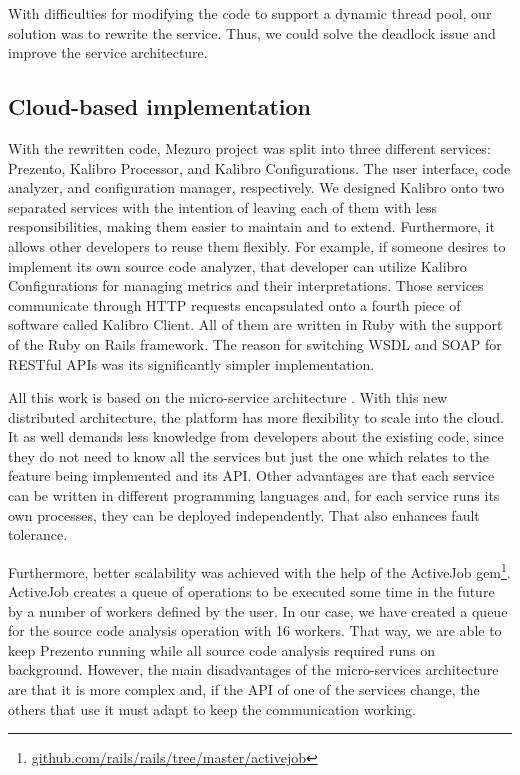 With difficulties for modifying the code to support a dynamic thread pool, our
solution was to rewrite the service. Thus, we could solve the deadlock issue
and improve the service architecture.

\subsection{Cloud-based implementation}
\label{subsec:cloud-based-implementation}

With the rewritten code, Mezuro project was split into three different
services: Prezento, Kalibro Processor, and Kalibro Configurations. The user
interface, code analyzer, and configuration manager, respectively. We designed
Kalibro onto two separated services with the intention of leaving each of them
with less responsibilities, making them easier to maintain and to extend.
Furthermore, it allows other developers to reuse them flexibly. For example, if
someone desires to implement its own source code analyzer, that developer can
utilize Kalibro Configurations for managing metrics and their interpretations.
Those services communicate through HTTP requests encapsulated onto a fourth
piece of software called Kalibro Client.  All of them are written in Ruby with
the support of the Ruby on Rails framework. The reason for switching WSDL and
SOAP for RESTful APIs was its significantly simpler implementation.

All this work is based on the micro-service architecture
\cite{namiot2014micro}. With this new distributed architecture, the platform has
more flexibility to scale into the cloud. It as well demands less knowledge
from developers about the existing code, since they do not need to know all the
services but just the one which relates to the feature being implemented and
its API. Other advantages are that each service can be written in different
programming languages and, for each service runs its own processes, they can be
deployed independently. That also enhances fault tolerance.

Furthermore, better scalability was achieved with the help of the ActiveJob
gem\footnote{\url{github.com/rails/rails/tree/master/activejob}}.  ActiveJob
creates a queue of operations to be executed some time in the future by a
number of workers defined by the user. In our case, we have created a queue for
the source code analysis operation with 16 workers. That way, we are able to
keep Prezento running while all source code analysis required runs on
background. However, the main disadvantages of the micro-services architecture
are that it is more complex and, if the API of one of the services change, the
others that use it must adapt to keep the communication working.

